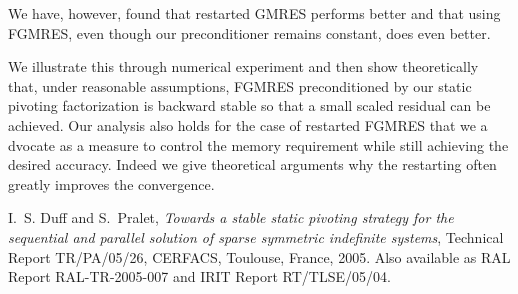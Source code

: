 \documentclass{report}
\begin{document}
We have, however, found that restarted GMRES performs better and that using
FGMRES,
even though our preconditioner remains constant, does even
better.

We illustrate this through numerical experiment and then show theoretically
that, under reasonable assumptions, FGMRES preconditioned by our static
pivoting
factorization is backward stable so that a small scaled residual can
be achieved. Our analysis also holds for the case of restarted FGMRES that we a
dvocate as a measure to control the memory requirement while still
achieving the desired accuracy. Indeed we give theoretical arguments why
the restarting often greatly improves the convergence.

\begin{thebibliography}{10}

{\sc I.~S. Duff and S.~Pralet}, {\em Towards a stable static pivoting strategy
for the sequential and parallel solution of sparse symmetric indefinite
systems}, {T}echnical {R}eport TR/PA/05/26, CERFACS, Toulouse, France, 2005.
\newblock Also available as RAL Report RAL-TR-2005-007 and IRIT Report
RT/TLSE/05/04.

\end{thebibliography}
\end{document}
